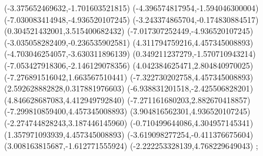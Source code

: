 {(-3.375652469632,-1.701603521815)
(-4.396574817954,-1.594046300004)
(-7.030083414948,-4.936520107245)
(-3.243374865704,-0.174830884517)
(0.304521432001,3.515400682432)
(-7.017307252449,-4.936520107245)
(-3.035058282409,-0.236535902581)
(4.311794759216,4.457345008893)
(-4.703046254057,-3.630311896139)
(0.349211237279,-1.570710943214)
(-7.053427918306,-2.146129078356)
(4.042384625471,2.804840970025)
(-7.276891516042,1.663567510441)
(-7.322730202758,4.457345008893)
(2.592628882828,0.317881976603)
(-6.938831201518,-2.425506828201)
(4.846628687083,4.412949792840)
(-7.271161680203,2.882670418857)
(-7.299810859400,4.457345008893)
(3.904816562301,4.936520107245)
(-2.274744828243,3.187446145960)
(-0.710499644086,4.304957145341)
(1.357971093939,4.457345008893)
(-3.619098277254,-0.411376675604)
(3.008163815687,-1.612771555924)
(-2.222253328139,4.768229649043)
};
